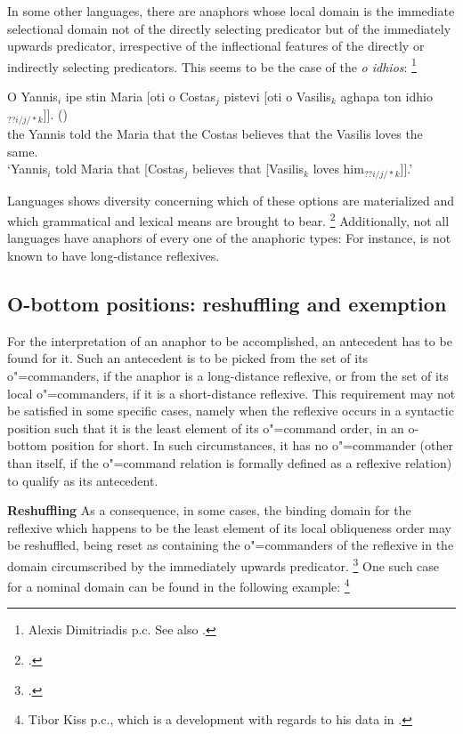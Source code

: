 \documentclass[output=paper
,modfonts
,nonflat]{langsci/langscibook}
\begin{document}
In some other languages, there are anaphors whose local domain
is the immediate selectional domain not of the directly selecting predicator
but of the immediately upwards predicator,  irrespective of the
inflectional features of the directly or indirectly selecting predicators. 
This seems to be the case of the  {\it o idhios}:%
%
\footnote{
Alexis Dimitriadis p.c. See also \citep{iatridou:86, varlokostaHornstein:93}. }

\enlargethispage*{2mm}

\begin{exe}
\ex
\gll O Yannis$_{i}$ ipe stin Maria [oti o Costas$_{j}$ pistevi [oti o Vasilis$_{k}$ aghapa ton
idhio$_{??i/j/*k}$]]. ()
\\ 
the Yannis told the Maria that the Costas believes that the Vasilis loves the same.\\
\trans `Yannis$_{i}$ told Maria that [Costas$_{j}$ believes that [Vasilis$_{k}$ loves
him$_{??i/j/*k}$]].'
\end{exe}

Languages shows diversity concerning which of these options are materialized
and which grammatical and lexical means are brought to bear.%
\footnote{
\citep{dimitriadisDatabase:2005}.
}
Additionally, not all languages have anaphors of every one of the anaphoric types:
For instance,  is not known to have long-distance reflexives.

\subsection{O-bottom positions: reshuffling and exemption}\label{Exemption}

For the interpretation of an anaphor to be accomplished,
an antecedent has to be found for it. Such an antecedent is to be picked from
the set of its o"=commanders, if the anaphor is a long-distance reflexive, 
or from the set of its local o"=commanders, if it is a short-distance reflexive.
This requirement may not be satisfied in some specific cases, namely
when the reflexive occurs in a syntactic position such that it is the
least element of its \mbox{o"=command} order, in an o-bottom position for short. In such
circumstances, it has no \mbox{o"=commander} (other than itself, if the o"=command relation
is formally defined as a reflexive relation) to qualify as its antecedent.

\textbf{Reshuffling} As a consequence, in some cases, the binding domain for the reflexive 
which happens to be the least element of its local obliqueness order may be reshuffled, being reset as 
containing the o"=commanders of the reflexive in the domain 
circumscribed by the immediately upwards predicator.%
\footnote{
\citep{brancoHpsg:2005}.
}
One such case for a nominal domain can be found in the following example:%
%
\footnote{Tibor Kiss p.c., which is a development with regards to his 
data in \citep{kiss:2001}.}
\end{document}
